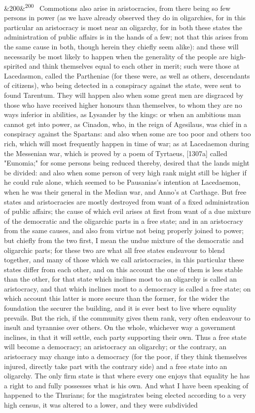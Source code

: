 \documentclass[12pt]{article}
\newcommand{\para}[1][]{\par\noindent\ifx&#1&\else\textsuperscript{\footnotesize #1}~\fi}
\begin{document}
\para[200] Commotions also arise in aristocracies, from there being so few persons in power (as we have already observed they do in oligarchies, for in this particular an aristocracy is most near an oligarchy, for in both these states the administration of public affairs is in the hands of a few; not that this arises from the same cause in both, though herein they chiefly seem alike): and these will necessarily be most likely to happen when the generality of the people are high-spirited and think themselves equal to each other in merit; such were those at Lacedasmon, called the Partheniae (for these were, as well as others, descendants of citizens), who being detected in a conspiracy against the state, were sent to found Tarentum. They will happen also when some great men are disgraced by those who have received higher honours than themselves, to whom they are no ways inferior in abilities, as Lysander by the kings: or when an ambitious man cannot get into power, as Cinadon, who, in the reign of Agesilaus, was chief in a conspiracy against the Spartans: and also when some are too poor and others too rich, which will most frequently happen in time of war; as at Lacedaemon during the Messenian war, which is proved by a poem of Tyrtaeus, [1307a] called "Eunomia;" for some persons being reduced thereby, desired that the lands might be divided: and also when some person of very high rank might still be higher if he could rule alone, which seemed to be Pausanias's intention at Lacedaemon, when he was their general in the Median war, and Anno's at Carthage. But free states and aristocracies are mostly destroyed from want of a fixed administration of public affairs; the cause of which evil arises at first from want of a due mixture of the democratic and the oligarchic parts in a free state; and in an aristocracy from the same causes, and also from virtue not being properly joined to power; but chiefly from the two first, I mean the undue mixture of the democratic and oligarchic parts; for these two are what all free states endeavour to blend together, and many of those which we call aristocracies, in this particular these states differ from each other, and on this account the one of them is less stable than the other, for that state which inclines most to an oligarchy is called an aristocracy, and that which inclines most to a democracy is called a free state; on which account this latter is more secure than the former, for the wider the foundation the securer the building, and it is ever best to live where equality prevails. But the rich, if the community gives them rank, very often endeavour to insult and tyrannise over others. On the whole, whichever way a government inclines, in that it will settle, each party supporting their own. Thus a free state will become a democracy; an aristocracy an oligarchy; or the contrary, an aristocracy may change into a democracy (for the poor, if they think themselves injured, directly take part with the contrary side) and a free state into an oligarchy. The only firm state is that where every one enjoys that equality he has a right to and fully possesses what is his own. And what I have been speaking of happened to the Thurians; for the magistrates being elected according to a very high census, it was altered to a lower, and they were subdivided 
\end{document}
